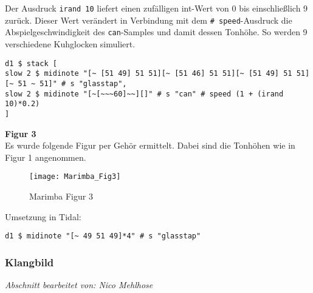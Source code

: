 \documentclass[
10pt, %
a4paper, %
oneside, %
headinclude,footinclude, %
BCOR5mm, %
]{scrartcl}
\begin{document}
\noindent Der Ausdruck \verb|irand 10| \cite{tid7} liefert einen zufälligen int-Wert von 0 bis einschließlich 9 zurück. Dieser Wert verändert in Verbindung mit dem \verb|# speed|-Ausdruck\cite{tid8} die Abspielgeschwindigkeit des \verb|can|-Samples und damit dessen Tonhöhe. So werden 9 verschiedene Kuhglocken simuliert.
\begin{lstlisting}
d1 $ stack [
slow 2 $ midinote "[~ [51 49] 51 51][~ [51 46] 51 51][~ [51 49] 51 51][~ 51 ~ 51]" # s "glasstap",
slow 2 $ midinote "[~[~~~60]~~][]" # s "can" # speed (1 + (irand 10)*0.2)
]
\end{lstlisting} 

\noindent \textbf{Figur 3}\\
Es wurde folgende Figur per Gehör ermittelt. Dabei sind die Tonhöhen wie in Figur 1 angenommen.
\begin{figure}[h]
	\centering 
	\texttt{[image: Marimba\_Fig3]} 
	\caption{Marimba Figur 3}
\end{figure}

\noindent Umsetzung in Tidal:
\begin{lstlisting}
d1 $ midinote "[~ 49 51 49]*4" # s "glasstap"
\end{lstlisting}


\subsubsection{Klangbild}
\textit{Abschnitt bearbeitet von: Nico Mehlhose}\\
\end{document}
